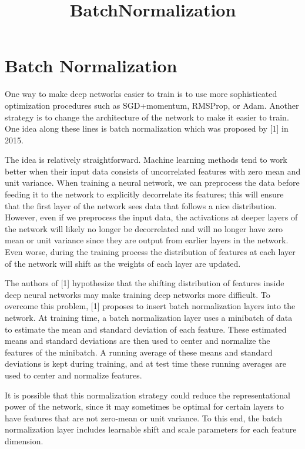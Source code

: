 \documentclass[11pt]{article}
\title{BatchNormalization}
\begin{document}
    
    \maketitle
    
    

    
    \hypertarget{batch-normalization}{%
\section{Batch Normalization}\label{batch-normalization}}

One way to make deep networks easier to train is to use more
sophisticated optimization procedures such as SGD+momentum, RMSProp, or
Adam. Another strategy is to change the architecture of the network to
make it easier to train. One idea along these lines is batch
normalization which was proposed by {[}1{]} in 2015.

The idea is relatively straightforward. Machine learning methods tend to
work better when their input data consists of uncorrelated features with
zero mean and unit variance. When training a neural network, we can
preprocess the data before feeding it to the network to explicitly
decorrelate its features; this will ensure that the first layer of the
network sees data that follows a nice distribution. However, even if we
preprocess the input data, the activations at deeper layers of the
network will likely no longer be decorrelated and will no longer have
zero mean or unit variance since they are output from earlier layers in
the network. Even worse, during the training process the distribution of
features at each layer of the network will shift as the weights of each
layer are updated.

The authors of {[}1{]} hypothesize that the shifting distribution of
features inside deep neural networks may make training deep networks
more difficult. To overcome this problem, {[}1{]} proposes to insert
batch normalization layers into the network. At training time, a batch
normalization layer uses a minibatch of data to estimate the mean and
standard deviation of each feature. These estimated means and standard
deviations are then used to center and normalize the features of the
minibatch. A running average of these means and standard deviations is
kept during training, and at test time these running averages are used
to center and normalize features.

It is possible that this normalization strategy could reduce the
representational power of the network, since it may sometimes be optimal
for certain layers to have features that are not zero-mean or unit
variance. To this end, the batch normalization layer includes learnable
shift and scale parameters for each feature dimension.
\end{document}
